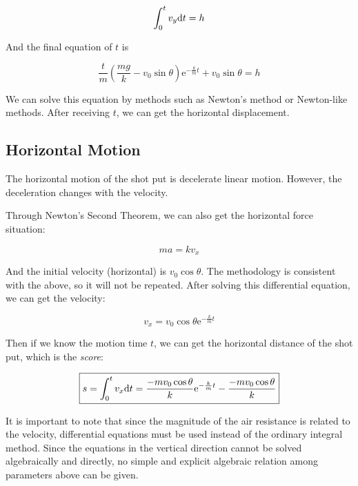 \documentclass{article}
\begin{document}
\begin{equation}
    \int^t_0v_y\mathrm{d} t=h
\end{equation}

And the final equation of $t$ is

\begin{equation}
    \boxed{\dfrac{t}{m}\left(\dfrac{mg}{k}-v_0\sin\theta\right)\mathrm{e}^{-\frac{k}{m}t}+v_0\sin\theta=h}
\end{equation}

We can solve this equation by methods such as Newton's method or Newton-like methods. After receiving $t$, we can get the horizontal displacement.

\subsection{Horizontal Motion}

The horizontal motion of the shot put is decelerate linear motion. However, the deceleration changes with the velocity.

Through Newton's Second Theorem, we can also get the horizontal force situation:

\begin{equation*}
    ma = kv_x
\end{equation*}

And the initial velocity (horizontal) is $v_0\cos\theta$. The methodology is consistent with the above, so it will not be repeated. After solving this differential equation, we can get the velocity:

\begin{equation}
    v_x=v_0\cos\theta\mathrm{e}^{-\frac{k}{m}t}
\end{equation}

Then if we know the motion time $t$, we can get the horizontal distance of the shot put, which is the \textit{score}:

\begin{equation}
    \boxed{s = \int^t_0 v_x \mathrm{d} t = \dfrac{-mv_0\cos\theta}{k}\mathrm{e}^{-\frac{k}{m}t} - \dfrac{-mv_0\cos\theta}{k}}
\end{equation}

It is important to note that since the magnitude of the air resistance is related to the velocity, differential equations must be used instead of the ordinary integral method. Since the equations in the vertical direction cannot be solved algebraically and directly, no simple and explicit algebraic relation among parameters above can be given.
\end{document}

